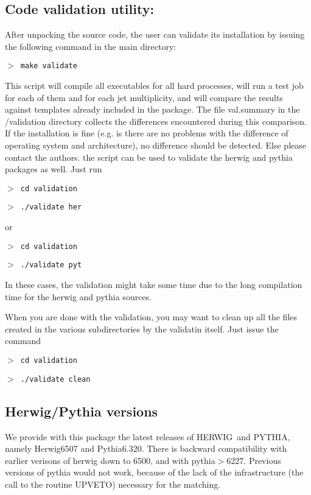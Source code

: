 \documentclass[paper]{JHEP3}
\def\herwig{{\small HERWIG}}
\def\pythia{{\small PYTHIA}}
\begin{document}
\begin{appendix}
\subsection{Code validation utility:}
After unpacking the source code, the user can validate its
installation by issuing the following command in the main directory:

{\tt $>$ make validate}

This script will compile all executables for all hard processes, will
run a test job for each of them and for each jet multiplicity, and
will compare the results against templates already included in the
package. The file val.summary in the /validation directory collects
the differences encountered during this comparison. If the
installation is fine (e.g. is there are no problems with the
difference of operating system and architecture), no difference should
be detected. Else please contact the authors.  the script can be used
to validate the herwig and pythia packages as well. Just run

{\tt $>$ cd validation}

{\tt $>$ ./validate her}

or
 
{\tt $>$ cd validation}
 
{\tt $>$ ./validate pyt}
 
In these cases, the validation might take some time due to the long
compilation time for the herwig and pythia sources. 

When you are done with the validation, you may want to clean up all
the files created in the various subdirectories by the validatin
itself. Just issue the command

{\tt $>$ cd validation}
 
{\tt $>$ ./validate clean}
 
\subsection{Herwig/Pythia versions}
We provide with this package the latest releases of \herwig\  and \pythia,
namely Herwig6507 and Pythia6.320. There is backward compatibility
with earlier verisons of herwig down to 6500, and with
pythia$>$6227. Previous versions of pythia would not work, because of
the lack of the infrastructure (the call to the routine UPVETO)
necessary for the matching. 


\end{appendix}
\end{document}

